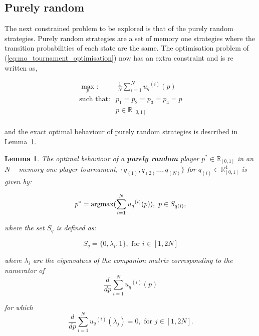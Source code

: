 \documentclass[10pt]{article}
\newcommand{\R}{\mathbb{R}}
\newtheorem{lemma}[theorem]{Lemma}
\begin{document}
\subsection{Purely random}\label{section:purely_analytical}

The next constrained problem to be explored is that of the purely random strategies.
Purely random strategies are a set of memory one strategies where the transition
probabilities of each state are the same. The optimisation problem of (\ref{eq:mo_tournament_optimisation})
now has an extra constraint and is re written as,

\begin{equation}\label{eq:random_optimisation}
\begin{aligned}
\max_p: & \ \frac{1}{N} \sum_{i=1} ^ {N} {u_q}^{(i)} (p)
\\
\text{such that}: & p_1 = p_2 = p_3 = p_4 = p \\
                  & p \in \R_{[0, 1]} \\
\end{aligned}
\end{equation}

and the exact optimal behaviour of purely random strategies is described in
Lemma~\ref{lemma:purely_optimisation}.

\begin{lemma}
    \label{lemma:purely_optimisation}
    The optimal behaviour of a \textbf{purely random} player \(p ^ * \in \R_{[0, 1]}\)
    in an \(N-\)memory one player tournament, \(\{q_{(1)}, q_{(2)} \dots,q_{(N)} \}
    \) for \(q_{(i)} \in \R_{[0, 1]} ^ 4\) is given by:

    \[p^* = \textnormal{argmax}(\sum_{i=1} ^ {N} {u_q}^{(i)} (p) ), \ p \in S_{q(i)},\]

    where the set \(S_{q}\) is defined as:

    \[S_{q} = \{0, \lambda_i, 1\},\text{ for } i \in [1, 2N]\]

    where \(\lambda_i\) are the eigenvalues of the companion matrix corresponding
    to the numerator of \[\frac{d}{dp} \sum_{i=1} ^ {N} {u_q}^{(i)} (p)\]

    for which
    \[\frac{d}{dp} \sum_{i=1} ^ {N} {u_q}^{(i)} (\lambda_j) = 0,\text{ for } j \in [1, 2N].\]
\end{lemma}
\end{document}
